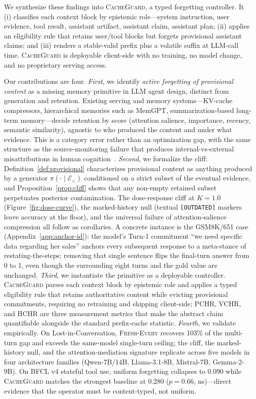 \documentclass{article}
\begin{document}
We synthesize these findings into \textsc{CacheGuard}, a typed forgetting controller. It (i) classifies each context block by epistemic role---system instruction, user evidence, tool result, assistant artifact, assistant claim, assistant plan; (ii) applies an eligibility rule that retains user/tool blocks but forgets provisional assistant claims; and (iii) renders a stable-valid prefix plus a volatile suffix at LLM-call time. \textsc{CacheGuard} is deployable client-side with no training, no model change, and no proprietary serving access.

Our contributions are four. \emph{First}, we identify \emph{active forgetting of provisional content} as a missing memory primitive in LLM agent design, distinct from generation and retention. Existing serving and memory systems---KV-cache compressors, hierarchical memories such as MemGPT, summarization-based long-term memory---decide retention by score (attention salience, importance, recency, semantic similarity), agnostic to who produced the content and under what evidence. This is a category error rather than an optimization gap, with the same structure as the source-monitoring failure that produces internal-vs-external misattributions in human cognition~\citep{johnson1993source}. \emph{Second}, we formalize the cliff: Definition~\ref{def:provisional} characterizes provisional content as anything produced by a generator $\pi(\cdot \mid \mathcal{E}_<)$ conditioned on a strict subset of the eventual evidence, and Proposition~\ref{prop:cliff} shows that any non-empty retained subset perpetuates posterior contamination. The dose-response cliff at $K{=}1.0$ (Figure~\ref{fig:dose-curve}), the marked-history null (textual \texttt{[OUTDATED]} markers leave accuracy at the floor), and the universal failure of attention-salience compression all follow as corollaries. A concrete instance is the GSM8K/651 case (Appendix~\ref{app:anchor-id}): the model's Turn-1 commitment ``we need specific data regarding her sales'' anchors every subsequent response to a meta-stance of restating-the-steps; removing that single sentence flips the final-turn answer from 0 to 1, even though the surrounding eight turns and the gold value are unchanged. \emph{Third}, we instantiate the primitive as a deployable controller. \textsc{CacheGuard} parses each context block by epistemic role and applies a typed eligibility rule that retains authoritative content while evicting provisional commitments, requiring no retraining and shipping client-side; PCHR, VCHR, and HCHR are three measurement metrics that make the abstract claim quantifiable alongside the standard prefix-cache statistic. \emph{Fourth}, we validate empirically. On Lost-in-Conversation, \textsc{Fresh-Every} recovers 103\% of the multi-turn gap and exceeds the same-model single-turn ceiling; the cliff, the marked-history null, and the attention-mediation signature replicate across five models in four architecture families (Qwen-7B/14B, Llama-3.1-8B, Mistral-7B, Gemma-2-9B). On BFCL v4 stateful tool use, uniform forgetting collapses to 0.090 while \textsc{CacheGuard} matches the strongest baseline at 0.280 ($p{=}0.66$, ns)---direct evidence that the operator must be content-typed, not uniform.
\end{document}
